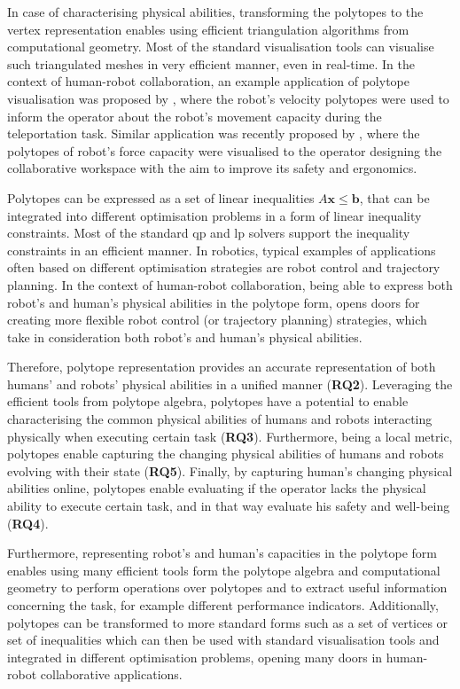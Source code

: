 In case of characterising physical abilities, transforming the polytopes to the vertex representation enables using efficient triangulation algorithms from computational geometry. Most of the standard visualisation tools can visualise such triangulated meshes in very efficient manner, even in real-time. 
In the context of human-robot collaboration, an example application of polytope visualisation was proposed by \citet{Zolotas2021}, where the  robot's velocity polytopes were used to inform the operator about the robot's movement capacity during the teleportation task. Similar application was recently proposed by \citet{Weistroffer2022Using}, where the polytopes  of robot's force capacity were visualised to the operator designing the collaborative workspace with the aim to improve its safety and ergonomics. 

Polytopes can be expressed as a set of linear inequalities $A\bm{x}\leq\bm{b}$, that can be integrated into different optimisation problems in a form of linear inequality constraints. Most of the standard \gls{qp} \cite{boggs_tolle_1995} and \gls{lp} \cite{GOLDFARB198973} solvers support the inequality constraints in an efficient manner. In robotics, typical examples of applications often based on different optimisation strategies are robot control and trajectory planning. In the context of human-robot collaboration, being able to express both robot's and human's physical abilities in the polytope form, opens doors for creating more flexible robot control (or trajectory planning) strategies, which take in consideration both robot's and human's physical abilities.

Therefore, polytope representation provides an accurate representation of both humans' and robots' physical abilities in a unified manner (\textbf{RQ2}). Leveraging the efficient tools from polytope algebra, polytopes have a potential to enable characterising the common physical abilities of humans and robots interacting physically when executing certain task (\textbf{RQ3}). Furthermore, being a local metric, polytopes enable capturing the changing physical abilities of humans and robots evolving with their state (\textbf{RQ5}). Finally, by capturing human's changing physical abilities online, polytopes enable evaluating if the operator lacks the physical ability to execute certain task, and in that way evaluate his safety and well-being (\textbf{RQ4}). 

Furthermore, representing robot's and human's capacities in the polytope form enables using many efficient tools form the polytope algebra and computational geometry to perform operations over polytopes and to extract useful information concerning the task, for example different performance indicators. Additionally, polytopes can be transformed to more standard forms such as a set of vertices or set of inequalities which can then be used with standard visualisation tools and integrated in different optimisation problems, opening many doors in human-robot collaborative applications.

